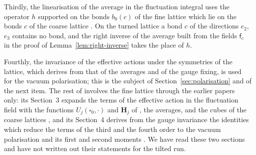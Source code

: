 \documentclass[11pt]{preprint}
\numberwithin{equation}{section}
\theoremstyle{definition}
\theoremstyle{remark}
\theoremstyle{plain}
\begin{document}
Thirdly, the linearisation of the average in the fluctuation integral uses the operator $h$ supported on the bonds $b_0(c)$ of the fine lattice which lie on the bonds $c$ of the coarse lattice \cite[p.~267]{BalabanRG1}. On the turned lattice a bond $c$ of the directions $e_2$, $e_3$ contains no bond, and the right inverse of the average built from the fields $\mathsf f_c$ in the proof of Lemma~\ref{lem:right-inverse} takes the place of $h$.

Fourthly, the invariance of the effective actions under the symmetries of the lattice, which \cite[(2.17), (2.18), p.~269]{BalabanRG1} derives from that of the averages and of the gauge fixing, is used for the vacuum polarisation; this is the subject of Section~\ref{sec:polarisation} and of the next item. The rest of \cite{BalabanRG1} involves the fine lattice through the earlier papers only: its Section~3 expands the terms of the effective action in the fluctuation field with the functions $U_j(\square_0, \cdot)$ and $\mathbf H_j$ of \cite{BalabanVAR}, the averages, and the cubes of the coarse lattices \cite[(3.3)--(3.54)]{BalabanRG1}, and its Section~4 derives from the gauge invariance the identities which reduce the terms of the third and the fourth order to the vacuum polarisation and its first and second moments \cite[(4.9)--(4.34)]{BalabanRG1}. We have read these two sections and have not written out their statements for the tilted run.
\end{document}
